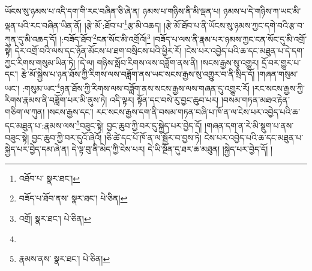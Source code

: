 ཡོངས་སུ་ཉམས་པ་འདི་དག་གི་རང་བཞིན་ཅི་ཞེ་ན། ཉམས་པ་གཉིས་ནི་མི་ལྡན་པ། ཉམས་པ་དེ་གཉིས་ཀ་ཡང་མི་ལྡན་པའི་རང་བཞིན་ཡིན་ནོ། །རྩེ་མོ་:ཐོབ་པ་\footnote{འཐོབ་པ་  སྣར་ཐང་། }རྩ་མི་འཆད། །རྩེ་མོ་ཐོབ་པ་ནི་ཡོངས་སུ་ཉམས་ཀྱང་དགེ་བའི་རྩ་བ་ཀུན་དུ་མི་འཆད་དོ། །:བཟོད་ཐོབ་\footnote{བཟོད་པ་ཐོབ་ནས་  སྣར་ཐང་།  པེ་ཅིན། }ངན་སོང་མི་འགྲོའོ།\footnote{འགྲོ།  སྣར་ཐང་།  པེ་ཅིན། } །བཟོད་པ་ལས་ནི་རྣམ་པར་ཉམས་ཀྱང་ངན་སོང་དུ་མི་འགྲོ་སྟེ། དེར་འགྲོ་བའི་ལས་དང་ཉོན་མོངས་པ་ཐག་བསྲིངས་པའི་ཕྱིར་རོ། །ངེས་པར་འབྱེད་པའི་ཆ་དང་མཐུན་པ་དེ་དག་ཀྱང་རིགས་གསུམ་ཡིན་ཏེ། །དེ་ལ། གཉིས་སློབ་རིགས་ལས་བཟློག་ནས་ནི། །སངས་རྒྱས་སུ་འགྱུར། དྲོ་བར་གྱུར་པ་དང་། རྩེ་མོ་སྐྱེས་པ་ཉན་ཐོས་ཀྱི་རིགས་ལས་བཟློག་ནས་ཡང་སངས་རྒྱས་སུ་འགྱུར་བ་ནི་སྲིད་དོ། །གཞན་གསུམ་ཡང་། :གསུམ་ཡང་\footnote{}ཉན་ཐོས་ཀྱི་རིགས་ལས་བཟློག་ནས་སངས་རྒྱས་ལས་གཞན་དུ་འགྱུར་རོ། །རང་སངས་རྒྱས་ཀྱི་རིགས་རྣམས་ནི་བཟློག་པར་མི་ནུས་ཏེ། འདི་ལྟར། སྟོན་དང་བསེ་རུ་བྱང་ཆུབ་པར། །བསམ་གཏན་མཐའ་རྟེན་གཅིག་ལ་ཀུན། །སངས་རྒྱས་དང་། རང་སངས་རྒྱས་དག་ནི་བསམ་གཏན་བཞི་པ་ཁོ་ན་ལ་ངེས་པར་འབྱེད་པའི་ཆ་དང་མཐུན་པ་:རྣམས་ལས་\footnote{རྣམས་ནས་  སྣར་ཐང་།  པེ་ཅིན། }བཟུང་སྟེ། བྱང་ཆུབ་ཀྱི་བར་དུ་སྐྱེད་པར་བྱེད་དོ། །གཞན་དག་ན་རེ་མི་སྡུག་པ་ནས་བཟུང་སྟེ། བྱང་ཆུབ་ཀྱི་བར་དུའོ་ཞེའོ། །ཅི་ཚེ་དང་པོ་ཁོ་ན་ལ་སྦྱོར་བ་བྱས་ཏེ། ངེས་པར་འབྱེད་པའི་ཆ་དང་མཐུན་པ་སྐྱེད་པར་བྱེད་དམ་ཞེ་ན། དེ་ལྟ་བུ་ནི་མེད་ཀྱི་ངེས་པར། དེ་ཡི་སྔོན་དུ་ཐར་ཆ་མཐུན། །སྐྱེད་པར་བྱེད་དོ། །
